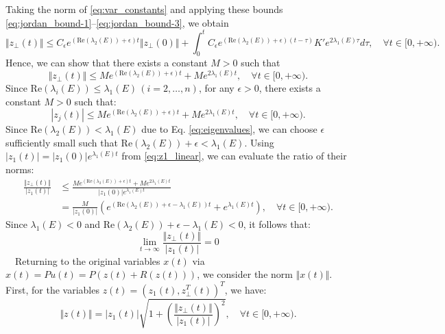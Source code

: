 \documentclass[11pt,a4paper]{article}
\begin{document}
Taking the norm of \eqref{eq:var_constants} and applying these bounds \eqref{eq:jordan_bound-1}--\eqref{eq:jordan_bound-3}, we obtain
\begin{equation}
\Vert{}z_{\perp}(t)\Vert{} \le C_{\epsilon} e^{(\mathrm{Re}(\lambda_2(E)) + \epsilon)t} \Vert{}z_{\perp}(0)\Vert{} + \int_0^t C_{\epsilon} e^{(\mathrm{Re}(\lambda_2(E)) + \epsilon)(t-\tau)} K' e^{2\lambda_1(E)\tau} d\tau, \quad \forall t \in [0,+\infty). \label{eq:integral_bound}
\end{equation}
Hence, we can show that there exists a constant $M > 0$ such that
\begin{equation}
\Vert{}z_{\perp}(t)\Vert{} \le M e^{(\mathrm{Re}(\lambda_2(E)) + \epsilon)t} + M e^{2\lambda_1(E)t}, \quad \forall t \in [0,+\infty). \label{eq:zj_bound}
\end{equation}
Since $\mathrm{Re}(\lambda_i(E)) \le \lambda_1(E)\,(i=2,\ldots,n)$, for any $\epsilon > 0$, there exists a constant $M > 0$ such that:
\begin{equation}
|z_j(t)| \le M e^{(\mathrm{Re}(\lambda_2(E)) + \epsilon)t} + M e^{2\lambda_1(E)t}, \quad \forall t \in [0,+\infty). \label{eq:zj_bound}
\end{equation}
Since $\mathrm{Re}(\lambda_2(E)) < \lambda_1(E)$ due to Eq.  \eqref{eq:eigenvalues}, we can choose $\epsilon$ sufficiently small such that $\mathrm{Re}(\lambda_2(E)) + \epsilon < \lambda_1(E)$. Using $\vert{}z_1(t)\vert{} = \vert{}z_1(0)\vert{} e^{\lambda_1(E) t}$ from \eqref{eq:z1_linear}, we can evaluate the ratio of their norms:
\begin{align}
\frac{\Vert{}z_{\perp}(t)\Vert{}}{|z_1(t)|} &\le \frac{M e^{(\mathrm{Re}(\lambda_2(E)) + \epsilon)t} + M e^{2\lambda_1(E)t}}{|z_1(0)| e^{\lambda_1(E) t}} \nonumber \\[0.2cm]
&= \frac{M}{|z_1(0)|} \left( e^{(\mathrm{Re}(\lambda_2(E)) + \epsilon - \lambda_1(E))t} + e^{\lambda_1(E)t} \right), \quad \forall t \in [0,+\infty). \label{eq:zj_decay_ratio}
\end{align}
Since $\lambda_1(E) < 0$ and $\mathrm{Re}(\lambda_2(E)) + \epsilon - \lambda_1(E) < 0$, it follows that:
\begin{equation}
\lim_{t \to \infty} \frac{\Vert{}z_{\perp}(t)\Vert{}}{|z_1(t)|} = 0 \label{eq:zj_limit}
\end{equation}
~~Returning to the original variables $x(t)$ via $x(t) = P u(t) = P(z(t) + R(z(t)))$, we consider the norm $\Vert{}x(t)\Vert{}$. First, for the variables $z(t) = (z_1(t), z_{\perp}^T(t))^T$, we have:
\begin{equation}
\Vert{}z(t)\Vert{} = |z_1(t)| \sqrt{1 + \left( \frac{\Vert{}z_{\perp}(t)\Vert{}}{|z_1(t)|} \right)^2}, \quad \forall t \in [0,+\infty). \label{eq:z_norm_ratio}
\end{equation}
\end{document}
